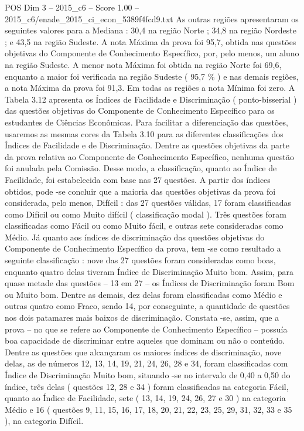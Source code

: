 \begin{textsample}{POS Dim 3 – 2015\_c6 – Score 1.00 – 2015\_c6/enade\_2015\_ci\_econ\_5389f4fcd9.txt}
As outras regiões apresentaram os seguintes valores para a Mediana : 30,4 na região Norte ; 34,8 na região Nordeste ; e 43,5 na região Sudeste.
A nota Máxima da prova foi 95,7, obtida nas questões objetivas do Componente de Conhecimento Específico, por, pelo menos, um aluno na região Sudeste.
A menor nota Máxima foi obtida na região Norte foi 69,6, enquanto a maior foi verificada na região Sudeste ( 95,7 \% ) e nas demais regiões, a nota Máxima da prova foi 91,3.
Em todas as regiões a nota Mínima foi zero.
A Tabela 3.12 apresenta os Índices de Facilidade e Discriminação ( ponto-bisserial ) das questões objetivas do Componente de Conhecimento Específico para os estudantes de Ciências Econômicas.
Para facilitar a diferenciação das questões, usaremos as mesmas cores da Tabela 3.10 para as diferentes classificações dos Índices de Facilidade e de Discriminação.
Dentre as questões objetivas da parte da prova relativa ao Componente de Conhecimento Específico, nenhuma questão foi anulada pela Comissão.
Desse modo, a classificação, quanto ao Índice de Facilidade, foi estabelecida com base nas 27 questões.
A partir dos índices obtidos, pode -se concluir que a maioria das questões objetivas da prova foi considerada, pelo menos, Difícil : das 27 questões válidas, 17 foram classificadas como Difícil ou como Muito difícil ( classificação modal ).
Três questões foram classificadas como Fácil ou como Muito fácil, e outras sete consideradas como Médio.
Já quanto aos índices de discriminação das questões objetivas do Componente de Conhecimento Específico da prova, tem -se como resultado a seguinte classificação : nove das 27 questões foram consideradas como boas, enquanto quatro delas tiveram Índice de Discriminação Muito bom.
Assim, para quase metade das questões – 13 em 27 – os Índices de Discriminação foram Bom ou Muito bom.
Dentre as demais, dez delas foram classificadas como Médio e outras quatro como Fraco, sendo 14, por conseguinte, a quantidade de questões nos dois patamares mais baixos de discriminação.
Constata -se, assim, que a prova – no que se refere ao Componente de Conhecimento Específico – possuía boa capacidade de discriminar entre aqueles que dominam ou não o conteúdo.
Dentre as questões que alcançaram os maiores índices de discriminação, nove delas, as de números 12, 13, 14, 19, 21, 24, 26, 28 e 34, foram classificadas com Índice de Discriminação Muito bom, situando -se no intervalo de 0,40 a 0,50 do índice, três delas ( questões 12, 28 e 34 ) foram classificadas na categoria Fácil, quanto ao Índice de Facilidade, sete ( 13, 14, 19, 24, 26, 27 e 30 ) na categoria Médio e 16 ( questões 9, 11, 15, 16, 17, 18, 20, 21, 22, 23, 25, 29, 31, 32, 33 e 35 ), na categoria Difícil.

\end{textsample}
